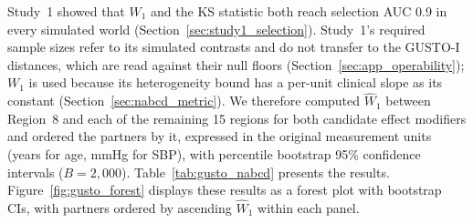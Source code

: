 \documentclass[AMA,Times1COL]{WileyNJDv5}
\begin{document}
Study~1 showed that $W_1$ and the KS statistic both reach selection AUC 0.9 in every simulated world (Section~\ref{sec:study1_selection}). Study~1's required sample sizes refer to its simulated contrasts and do not transfer to the GUSTO-I distances, which are read against their null floors (Section~\ref{sec:app_operability}); $W_1$ is used because its heterogeneity bound has a per-unit clinical slope as its constant (Section~\ref{sec:nabcd_metric}). We therefore computed $\widehat{W}_1$ between Region~8 and each of the remaining 15 regions for both candidate effect modifiers and ordered the partners by it, expressed in the original measurement units (years for age, mmHg for SBP), with percentile bootstrap 95\% confidence intervals ($B = 2{,}000$). Table~\ref{tab:gusto_nabcd} presents the results. Figure~\ref{fig:gusto_forest} displays these results as a forest plot with bootstrap CIs, with partners ordered by ascending $\widehat{W}_1$ within each panel.
\end{document}
